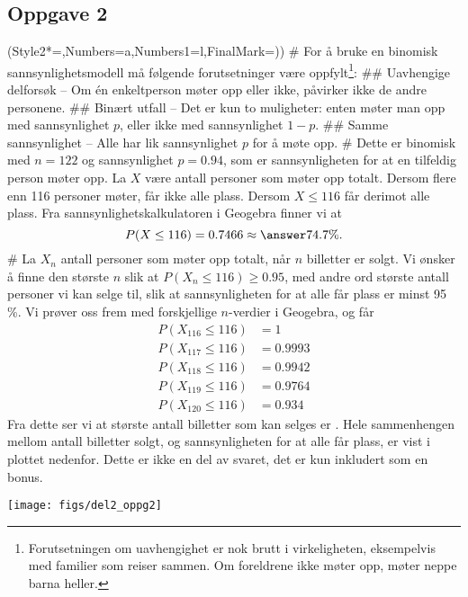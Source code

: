 \subsection*{Oppgave 2}
\begin{easylist}[enumerate]
	\ListProperties(Style2*=,Numbers=a,Numbers1=l,FinalMark={)})
	# For å bruke en binomisk sannsynlighetsmodell må følgende forutsetninger være oppfylt\footnote{Forutsetningen om uavhengighet er nok brutt i virkeligheten, eksempelvis med familier som reiser sammen. Om foreldrene ikke møter opp, møter neppe barna heller.}:
	## Uavhengige delforsøk -- Om én enkeltperson møter opp eller ikke, påvirker ikke de andre personene.
	## Binært utfall -- Det er kun to muligheter: enten møter man opp med sannsynlighet $p$, eller ikke med sannsynlighet $1 - p$.
	## Samme sannsynlighet -- Alle har lik sannsynlighet $p$ for å møte opp.
	# Dette er binomisk med $n = 122$ og sannsynlighet $p = 0.94$, som er sannsynligheten for at en tilfeldig person møter opp. La $X$ være antall personer som møter opp totalt. Dersom flere enn 116 personer møter, får ikke alle plass. Dersom $X \leq 116$ får derimot alle plass.
	Fra sannsynlighetskalkulatoren i Geogebra finner vi at
	\begin{equation*}
		P(X \leq 116) = 0.7466 \approx \answer{74.7 \%}.
	\end{equation*}
	# La $X_n$ antall personer som møter opp totalt, når $n$ billetter er solgt. Vi ønsker å finne den største $n$ slik at $P(X_n \leq 116) \geq 0.95$, med andre ord største antall personer vi kan selge til, slik at sannsynligheten for at alle får plass er minst 95 \%.
	Vi prøver oss frem med forskjellige $n$-verdier i Geogebra, og får
	\begin{align*}
		P(X_{116} \leq 116) &= 1 \\
		P(X_{117} \leq 116) &= 0.9993 \\
		P(X_{118} \leq 116) &= 0.9942 \\
		P(X_{119} \leq 116) &= 0.9764 \\
		P(X_{120} \leq 116) &= 0.934 
	\end{align*}
	Fra dette ser vi at største antall billetter som kan selges er .
	Hele sammenhengen mellom antall billetter solgt, og sannsynligheten for at alle får plass, er vist i plottet nedenfor. Dette er ikke en del av svaret, det er kun inkludert som en bonus.
	\begin{center}
		\texttt{[image: figs/del2\_oppg2]}
	\end{center}
\end{easylist}


